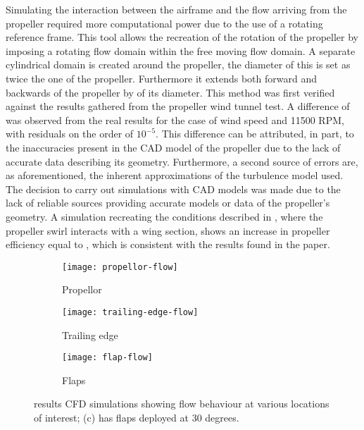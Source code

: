 \documentclass[../../main.tex]{subfiles}
\begin{document}
Simulating the interaction between the airframe and the flow arriving from the propeller required more computational power due to the use of a rotating reference frame.
This tool allows the recreation of the rotation of the propeller by imposing a rotating flow domain within the free moving flow domain.
A separate cylindrical domain is created around the propeller, the diameter of this is set as twice the one of the propeller.
Furthermore it extends both forward and backwards of the propeller by  of its diameter.
This method was first verified against the results gathered from the propeller wind tunnel test.
A difference of  was observed from the real results for the case of  wind speed and 11500 RPM, with residuals on the order of $10^{-5}$.
This difference can be attributed, in part, to the inaccuracies present in the CAD model of the propeller due to the lack of accurate data describing its geometry.
Furthermore, a second source of errors are, as aforementioned, the inherent approximations of the turbulence model used.
The decision to carry out simulations with CAD models was made due to the lack of reliable sources providing accurate models or data of the propeller's geometry.
A simulation recreating the conditions described in \cite{kroo-86}, where the propeller swirl interacts with a wing section, shows an increase in propeller efficiency equal to , which is consistent with the results found in the paper.


\begin{figure}[H]

    \centering
    \begin{subfigure}[b]{0.49\columnwidth}
        \centering
        \texttt{[image: propellor-flow]}
        \caption{Propellor}
        \label{fig:flow-behaviour:propellor}
    \end{subfigure}
    \hfill
    \begin{subfigure}[b]{0.49\columnwidth}
        \centering
        \texttt{[image: trailing-edge-flow]}
        \caption{Trailing edge}
        \label{fig:flow-behaviour:trailing-edge}
    \end{subfigure}

    \begin{subfigure}[b]{0.49\columnwidth}
        \centering
        \texttt{[image: flap-flow]}
        \caption{Flaps}
        \label{fig:flow-behaviour:flaps}
    \end{subfigure}
    
    \caption{results CFD simulations showing flow behaviour at various locations of interest; (c) has flaps deployed at 30 degrees.}
    \label{fig:flow-behaviour}
\end{figure} 
\end{document}
